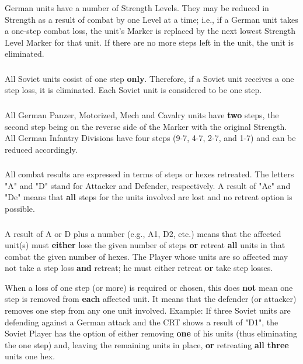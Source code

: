 \subsubsection{} German units have a number of Strength Levels. They may be reduced in Strength as a result of combat by one Level at a time; i.e., if a German unit takes a one-step combat loss, the unit's Marker is replaced by the next lowest Strength Level Marker for that unit. If there are no more steps left in the unit, the unit is eliminated.

\subsubsection{} All Soviet units cosist of one step \textbf{only}. Therefore, if a Soviet unit receives a one step loss, it is eliminated. Each Soviet unit is considered to be one step.

\subsubsection{} All German Panzer, Motorized, Mech and Cavalry units have \textbf{two} steps, the second step being on the reverse side of the Marker with the original Strength. All German Infantry Divisions have four steps (9-7, 4-7, 2-7, and 1-7) and can be reduced accordingly.

\subsubsection{} All combat results are expressed in terms of steps or hexes retreated. The letters "A" and "D" stand for Attacker and Defender, respectively. A result of "Ae" and "De" means that \textbf{all} steps for the units involved are lost and no retreat option is possible.

\subsubsection{} A result of A or D plus a number (e.g., A1, D2, etc.) means that the affected unit(s) must \textbf{either} lose the given number of steps \textbf{or} retreat \textbf{all} units in that combat the given number of hexes. The Player whose units are so affected may not take a step loss \textbf{and} retreat; he must either retreat \textbf{or} take step losses.

When a loss of one step (or more) is required or chosen, this does \textbf{not} mean one step is removed from \textbf{each} affected unit. It means that the defender (or attacker) removes one step from any one unit involved. Example: If three Soviet units are defending against a German attack and the CRT shows a result of "D1", the Soviet Player has the option of either removing \textbf{one} of his units (thus eliminating the one step) and, leaving the remaining units in place, \textbf{or} retreating \textbf{all three} units one hex.

